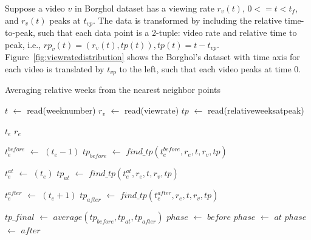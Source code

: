 Suppose a video $v$ in Borghol dataset has a viewing rate $r_v(t)$, $0 <= t < t_f$, and $r_v(t)$ peaks at $t_{vp}$.
The data is transformed by including the relative time-to-peak, such that each data point is a 2-tuple: video rate and relative time to peak, i.e., $rp_v(t) = ( r_v(t), tp(t) ), tp(t) = t - t_{vp}$.
Figure~\ref{fig:viewratedistribution} shows the Borghol's dataset with time axis for each video is translated by $t_{vp}$ to the left, such that each video peaks at time $0$.



\begin{algorithm}
\caption{Averaging relative weeks from the nearest neighbor points}
\label{alg2}
\begin{algorithmic}[1]

\STATE $t$ $\leftarrow$ read(weeknumber) 
\STATE $r_v$ $\leftarrow$ read(viewrate) 
\STATE $tp$ $\leftarrow$ read(relativeweeksatpeak) 

\STATE $t_e$ 
\STATE $r_e$ 

\STATE $t_e^{before}$ $\leftarrow$ $(t_e - 1)$ 
\STATE $tp_{before}$ $\leftarrow$ $find\_tp(t_e^{before},r_e,t,r_v,tp)$

\STATE $t_e^{at}$ $\leftarrow$ $(t_e)$ 
\STATE $tp_{at}$ $\leftarrow$ $find\_tp(t_e^{at},r_e,t,r_v,tp)$

\STATE $t_e^{after}$ $\leftarrow$ $(t_e+1)$ 
\STATE $tp_{after}$ $\leftarrow$ $find\_tp(t_e^{after},r_e,t,r_v,tp)$

\STATE $tp\_final$ $\leftarrow$ $average(tp_{before}, tp_{at}, tp_{after})$
\STATE $phase$ $\leftarrow$ $before$
\STATE $phase$ $\leftarrow$ $at$
\ELSE
\STATE $phase$ $\leftarrow$ $after$
\ENDIF
\end{algorithmic}
\end{algorithm}

